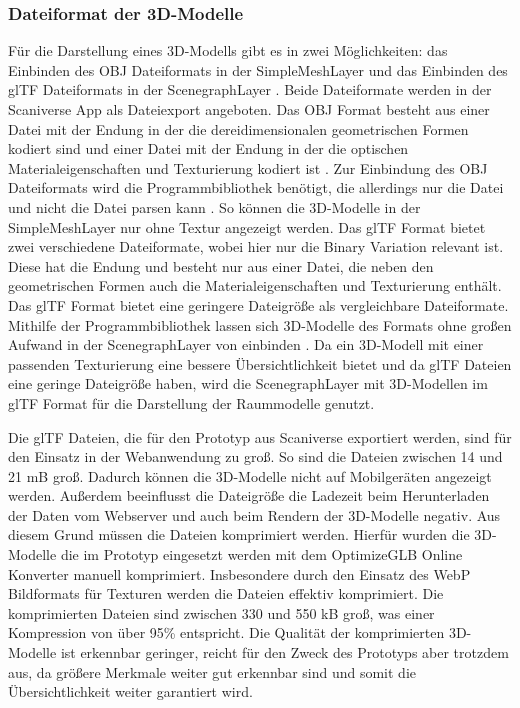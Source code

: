 \subsubsection{Dateiformat der 3D-Modelle}\label{sec:ModelFileFormat}
Für die Darstellung eines 3D-Modells gibt es in \deckgl zwei Möglichkeiten: das Einbinden des \ac{OBJ} Dateiformats in der SimpleMeshLayer \cite{DeckglSimpleMeshLayer} und das Einbinden des \ac{glTF} Dateiformats in der ScenegraphLayer \cite{DeckglScenegraphLayer}. Beide Dateiformate werden in der Scaniverse App als Dateiexport angeboten. Das \ac{OBJ} Format besteht aus einer Datei mit der Endung \obj{} in der die dereidimensionalen geometrischen Formen kodiert sind \cite{OBJSpec} und einer Datei mit der Endung \mtl{} in der die optischen Materialeigenschaften und Texturierung kodiert ist \cite{MTLSpec}. Zur Einbindung des \ac{OBJ} Dateiformats wird die \loadersgl{} Programmbibliothek benötigt, die allerdings nur die \obj Datei und nicht die \mtl Datei parsen kann \cite{OBJLoader}. So können die 3D-Modelle in der SimpleMeshLayer nur ohne Textur angezeigt werden. Das \ac{glTF} Format bietet zwei verschiedene Dateiformate, wobei hier nur die Binary Variation relevant ist. Diese hat die Endung \glb{} und besteht nur aus einer Datei, die neben den geometrischen Formen auch die Materialeigenschaften und Texturierung enthält. Das \ac{glTF} Format bietet eine geringere Dateigröße als vergleichbare Dateiformate.\cite[Abschnitt 2]{glTFSpec} Mithilfe der \loadersgl{} Programmbibliothek lassen sich 3D-Modelle des Formats ohne großen Aufwand in der ScenegraphLayer von \deckgl{} einbinden \cite{DeckglScenegraphLayer}. Da ein 3D-Modell mit einer passenden Texturierung eine bessere Übersichtlichkeit bietet und da \ac{glTF} Dateien eine geringe Dateigröße haben, wird die ScenegraphLayer mit 3D-Modellen im \ac{glTF} Format für die Darstellung der Raummodelle genutzt.

Die \ac{glTF} Dateien, die für den Prototyp aus Scaniverse exportiert werden, sind für den Einsatz in der Webanwendung zu groß. So sind die Dateien zwischen 14 und 21 \ac{mB} groß. Dadurch können die 3D-Modelle nicht auf Mobilgeräten angezeigt werden. Außerdem beeinflusst die Dateigröße die Ladezeit beim Herunterladen der Daten vom Webserver und auch beim Rendern der 3D-Modelle negativ. Aus diesem Grund müssen die Dateien komprimiert werden. Hierfür wurden die 3D-Modelle die im Prototyp eingesetzt werden mit dem OptimizeGLB Online Konverter manuell komprimiert. Insbesondere durch den Einsatz des \ac{WebP} Bildformats für Texturen werden die Dateien effektiv komprimiert.\cite{OptimizeGLB} Die komprimierten Dateien sind zwischen 330 und 550 \ac{kB} groß, was einer Kompression von über 95\% entspricht. Die Qualität der komprimierten 3D-Modelle ist erkennbar geringer, reicht für den Zweck des Prototyps aber trotzdem aus, da größere Merkmale weiter gut erkennbar sind und somit die Übersichtlichkeit weiter garantiert wird.

